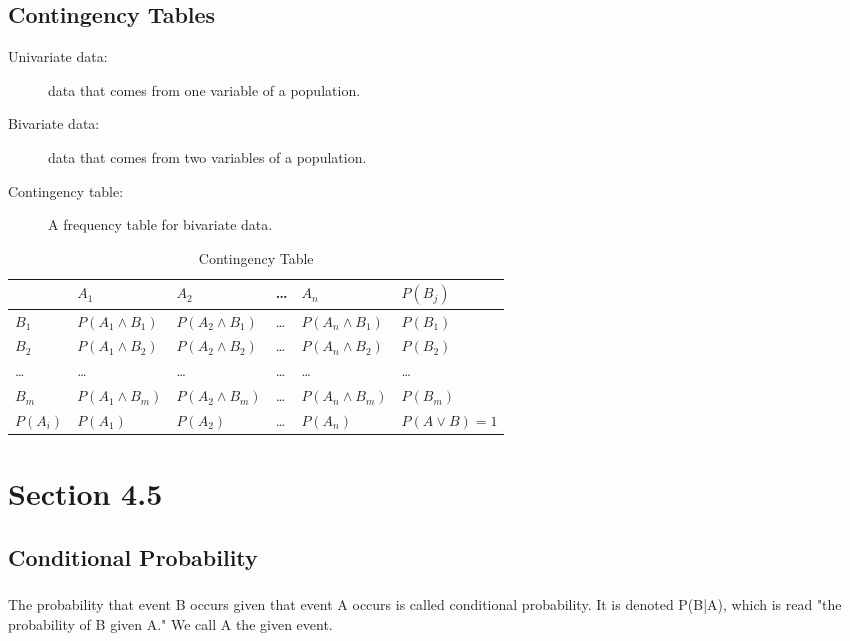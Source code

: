 \documentclass[12pt]{article}
\begin{document}
        \subsection*{Contingency Tables}
        \begin{description}
            \item[Univariate data:] data that comes from one variable of a population.
            \item[Bivariate data:] data that comes from two variables of a population.
            \item[Contingency table:] A frequency table for bivariate data.  
        \end{description}
                \begin{center}
                    \begin{table}[h!]
                        \centering
                        \caption{Contingency Table}
                        \begin{tabular}{l|l|l|l|l|l}
         & $A_1$               & $A_2$               & \dots & $A_n$               & $P(B_j)$          \\
\hline
$B_1$    & $P(A_1 \wedge B_1)$ & $P(A_2 \wedge B_1)$ & \dots & $P(A_n \wedge B_1)$ & $P(B_1)$         \\
$B_2$    & $P(A_1 \wedge B_2)$ & $P(A_2 \wedge B_2)$ & \dots & $P(A_n \wedge B_2)$ & $P(B_2)$         \\
\dots    & \dots               & \dots               & \dots & \dots               & \dots            \\
$B_m$    & $P(A_1 \wedge B_m)$ & $P(A_2 \wedge B_m)$ & \dots & $P(A_n \wedge B_m)$ & $P(B_m)$         \\
$P(A_i)$ & $P(A_1)$            & $P(A_2)$            & \dots & $P(A_n)$            & $P(A \vee B) =1$ \\
                        \end{tabular}
                      \end{table}
                \end{center}
    \section*{Section 4.5}
        \subsection*{Conditional Probability}
            \subsubsection*{}
                The probability that event B occurs given that event A occurs is called conditional 
                probability. It is denoted P(B|A),
                which is read "the probability of B given A." We call A the given event.
\end{document}
